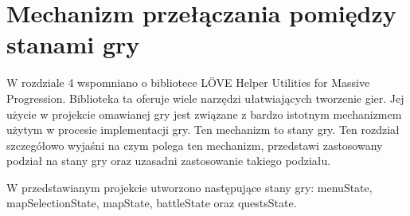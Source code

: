 \chapter{Mechanizm przełączania pomiędzy stanami gry}
W rozdziale 4 wspomniano o bibliotece LÖVE Helper Utilities for Massive 
Progression. Biblioteka ta oferuje wiele narzędzi ułatwiających tworzenie gier. 
Jej użycie w projekcie omawianej gry jest związane z bardzo istotnym mechanizmem 
użytym w procesie implementacji gry. Ten mechanizm to stany gry.
Ten rozdział szczegółowo wyjaśni na czym polega ten mechanizm, przedstawi 
zastosowany podział na stany gry oraz uzasadni zastosowanie takiego podziału.

W przedstawianym projekcie utworzono następujące stany gry: menuState, 
mapSelectionState, mapState, battleState oraz questsState.